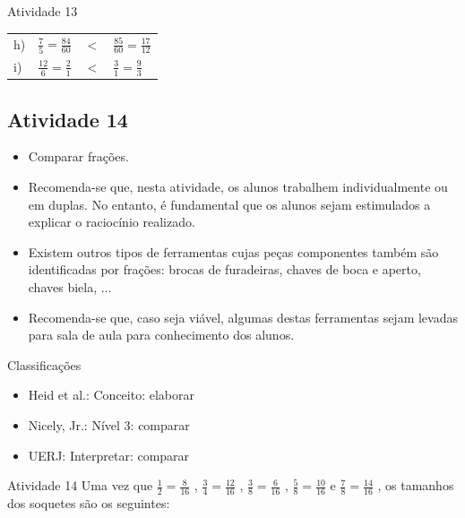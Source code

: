 \begin{multicols}{2}
\begin{resposta*}{Atividade 13}
\begin{tabular}{lrcl}
       h) &  $\frac{7}{5} = \frac{84}{60}$ &   $<$  &  $\frac{85}{60} = 
\frac{17}{12}$ \\
     
       i) &  $\frac{12}{6} = \frac{2}{1}$ &   $<$  &  $\frac{3}{1} = 
\frac{9}{3}$ \\
      
    \end{tabular}
\end{resposta*}

\clearpage

\subsection{Atividade 14}

\begin{itemize} %
    \item       Comparar frações.
\end{itemize} %
  
  
 
\begin{itemize} %
    \item       Recomenda-se que, nesta atividade, os alunos trabalhem 
individualmente ou em duplas. No entanto, é fundamental que os alunos sejam 
estimulados a explicar o raciocínio realizado.
    \item       Existem outros tipos de ferramentas cujas peças componentes 
também são identificadas por frações: brocas de furadeiras, chaves de boca e 
aperto, chaves biela,       $\ldots$
    \item       Recomenda-se que, caso seja viável, algumas destas ferramentas 
sejam levadas para sala de aula para conhecimento dos alunos.
\end{itemize} %
  
  
  Classificações  
\begin{itemize} %
    \item       Heid et al.: Conceito: elaborar
    \item       Nicely, Jr.: Nível 3: comparar
    \item       UERJ: Interpretar: comparar
\end{itemize} %

\begin{resposta*}{Atividade 14}
  Uma vez que   $\frac{1}{2} = \frac{8}{16}$  ,   $\frac{3}{4} = \frac{12}{16}$  
,   $\frac{3}{8} = \frac{6}{16}$  ,   $\frac{5}{8} = \frac{10}{16}$   e   
$\frac{7}{8} = \frac{14}{16}$  , os tamanhos dos soquetes são os seguintes:  
  

\end{resposta*}
\end{multicols}
